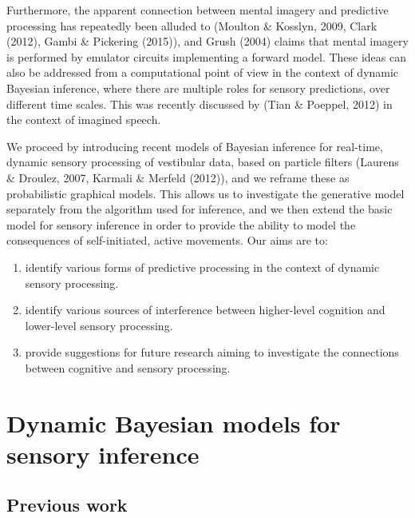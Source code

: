\documentclass[english,floatsintext,man]{apa6}
\providecommand{\tightlist}{%
  \setlength{\itemsep}{0pt}\setlength{\parskip}{0pt}}
\theoremstyle{definition}
\theoremstyle{definition}
\theoremstyle{remark}
\begin{document}
Furthermore, the apparent connection between mental imagery and
predictive processing has repeatedly been alluded to (Moulton \&
Kosslyn, 2009, Clark (2012), Gambi \& Pickering (2015)), and Grush
(2004) claims that mental imagery is performed by emulator circuits
implementing a forward model. These ideas can also be addressed from a
computational point of view in the context of dynamic Bayesian
inference, where there are multiple roles for sensory predictions, over
different time scales. This was recently discussed by (Tian \& Poeppel,
2012) in the context of imagined speech.

We proceed by introducing recent models of Bayesian inference for
real-time, dynamic sensory processing of vestibular data, based on
particle filters (Laurens \& Droulez, 2007, Karmali \& Merfeld (2012)),
and we reframe these as probabilistic graphical models. This allows us
to investigate the generative model separately from the algorithm used
for inference, and we then extend the basic model for sensory inference
in order to provide the ability to model the consequences of
self-initiated, active movements. Our aims are to:

\begin{enumerate}
\def\labelenumi{\arabic{enumi})}
\tightlist
\item
  identify various forms of predictive processing in the context of
  dynamic sensory processing.
\item
  identify various sources of interference between higher-level
  cognition and lower-level sensory processing.
\item
  provide suggestions for future research aiming to investigate the
  connections between cognitive and sensory processing.
\end{enumerate}

\section{Dynamic Bayesian models for sensory
inference}\label{dynamic-bayesian-models-for-sensory-inference}

\subsection{Previous work}\label{previous-work}
\end{document}
